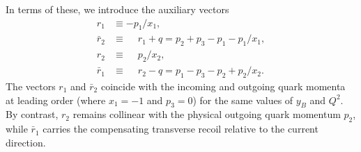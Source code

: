 \documentclass[a4paper,11pt]{article}
\begin{document}
In terms of these, we introduce the auxiliary vectors
\begin{align}
  r_1       &\equiv          - p_1/x_1,\\
  \bar{r}_2 &\equiv \phantom{-}r_1+q=p_2+p_3-p_1-p_1/x_1,\\
  r_2       &\equiv \phantom{-}p_2/x_2,\\
  \bar{r}_1 &\equiv \phantom{-}r_2-q=p_1-p_3-p_2+p_2/x_2.
\end{align}
The vectors $r_1$ and $\bar{r}_2$ coincide with the incoming and outgoing quark momenta at leading order (where $x_1=-1$ and $p_3=0$) for the same values of $y_B$ and $Q^2$. By contrast, $r_2$ remains collinear with the physical outgoing quark momentum $p_2$, while $\bar{r}_1$ carries the compensating transverse recoil relative to the current direction.
\end{document}
